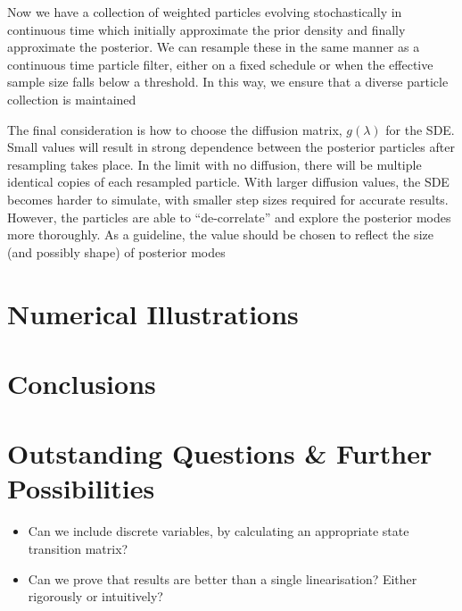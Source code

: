 \documentclass{article}
\begin{document}
Now we have a collection of weighted particles evolving stochastically in continuous time which initially approximate the prior density and finally approximate the posterior. We can resample these in the same manner as a continuous time particle filter, either on a fixed schedule or when the effective sample size falls below a threshold. In this way, we ensure that a diverse particle collection is maintained

The final consideration is how to choose the diffusion matrix, $g(\lambda)$ for the SDE. Small values will result in strong dependence between the posterior particles after resampling takes place. In the limit with no diffusion, there will be multiple identical copies of each resampled particle. With larger diffusion values, the SDE becomes harder to simulate, with smaller step sizes required for accurate results. However, the particles are able to ``de-correlate'' and explore the posterior modes more thoroughly. As a guideline, the value should be chosen to reflect the size (and possibly shape) of posterior modes


\section{Numerical Illustrations}



\section{Conclusions}



\section{Outstanding Questions \& Further Possibilities}

\begin{itemize}
  \item Can we include discrete variables, by calculating an appropriate state transition matrix?
  \item Can we prove that results are better than a single linearisation? Either rigorously or intuitively?
\end{itemize}
\end{document}
